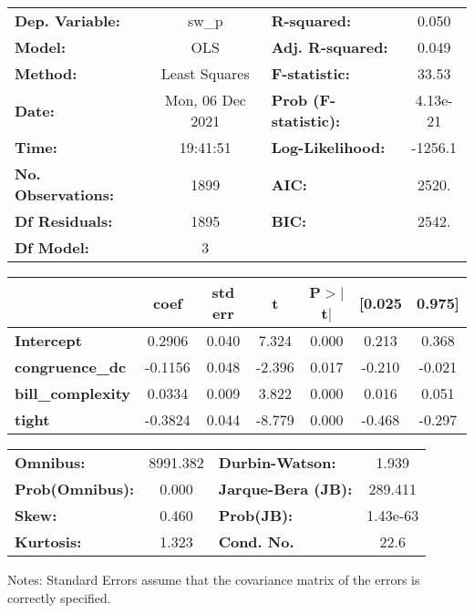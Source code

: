 \begin{center}
\begin{tabular}{lclc}
\toprule
\textbf{Dep. Variable:}    &      sw\_p       & \textbf{  R-squared:         } &     0.050   \\
\textbf{Model:}            &       OLS        & \textbf{  Adj. R-squared:    } &     0.049   \\
\textbf{Method:}           &  Least Squares   & \textbf{  F-statistic:       } &     33.53   \\
\textbf{Date:}             & Mon, 06 Dec 2021 & \textbf{  Prob (F-statistic):} &  4.13e-21   \\
\textbf{Time:}             &     19:41:51     & \textbf{  Log-Likelihood:    } &   -1256.1   \\
\textbf{No. Observations:} &        1899      & \textbf{  AIC:               } &     2520.   \\
\textbf{Df Residuals:}     &        1895      & \textbf{  BIC:               } &     2542.   \\
\textbf{Df Model:}         &           3      & \textbf{                     } &             \\
\bottomrule
\end{tabular}
\begin{tabular}{lcccccc}
                          & \textbf{coef} & \textbf{std err} & \textbf{t} & \textbf{P$> |$t$|$} & \textbf{[0.025} & \textbf{0.975]}  \\
\midrule
\textbf{Intercept}        &       0.2906  &        0.040     &     7.324  &         0.000        &        0.213    &        0.368     \\
\textbf{congruence\_dc}   &      -0.1156  &        0.048     &    -2.396  &         0.017        &       -0.210    &       -0.021     \\
\textbf{bill\_complexity} &       0.0334  &        0.009     &     3.822  &         0.000        &        0.016    &        0.051     \\
\textbf{tight}            &      -0.3824  &        0.044     &    -8.779  &         0.000        &       -0.468    &       -0.297     \\
\bottomrule
\end{tabular}
\begin{tabular}{lclc}
\textbf{Omnibus:}       & 8991.382 & \textbf{  Durbin-Watson:     } &    1.939  \\
\textbf{Prob(Omnibus):} &   0.000  & \textbf{  Jarque-Bera (JB):  } &  289.411  \\
\textbf{Skew:}          &   0.460  & \textbf{  Prob(JB):          } & 1.43e-63  \\
\textbf{Kurtosis:}      &   1.323  & \textbf{  Cond. No.          } &     22.6  \\
\bottomrule
\end{tabular}
\end{center}

Notes: \newline
 [1] Standard Errors assume that the covariance matrix of the errors is correctly specified.